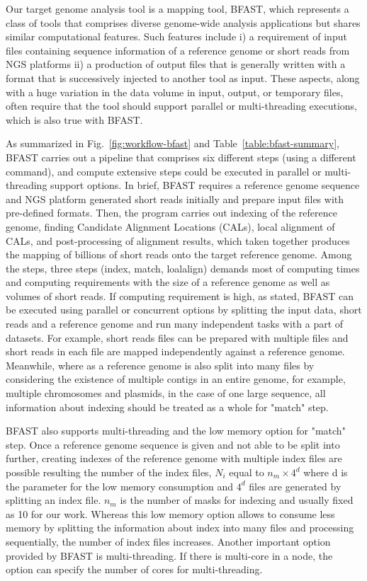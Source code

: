 \documentclass{acm_proc_article-sp}
\begin{document}
Our target genome analysis tool is a mapping tool, BFAST\cite{bfast2009,bfast2009b}, which represents a class of tools that comprises diverse genome-wide analysis applications but shares similar computational features.  Such features include i) a requirement of input files containing sequence information of a reference genome or short reads from NGS platforms ii) a production of output files that is generally written with a format that is successively injected to another tool as input.  These aspects, along with a huge variation in the data volume in input, output, or temporary files, often require that the tool should support parallel or multi-threading executions, which is also true with BFAST\cite{bfast2009}.

As summarized in Fig.~\ref{fig:workflow-bfast} and Table~\ref{table:bfast-summary}, BFAST carries out a pipeline that comprises six different steps (using a different command), and compute extensive steps could be executed in parallel or multi-threading support options.  In brief, BFAST requires a reference genome sequence and NGS platform generated short reads initially and prepare input files with pre-defined formats.  Then, the program carries out indexing of the reference genome, finding Candidate Alignment Locations (CALs), local alignment of CALs, and post-processing of alignment results, which taken together produces the mapping of billions of short reads onto the target reference genome.  Among the steps, three steps (index, match, loalalign) demands most of computing times and computing requirements with the size of a reference genome as well as volumes of short reads.  If computing requirement is high, as stated, BFAST can be executed using parallel or concurrent options by splitting the input data, short reads and a reference genome and run many independent tasks with a part of datasets.  For example, short reads files can be prepared with multiple files and short reads in each file are mapped independently against a reference genome.  Meanwhile, where as a reference genome is also split into many files by considering the existence of multiple contigs in an entire genome, for example, multiple chromosomes and plasmids, in the case of one large sequence, all information about indexing should be treated as a whole for "match" step. 

BFAST also supports multi-threading and the low memory option for "match" step. Once a reference genome sequence is given and not able to be split into further, creating indexes of the reference genome with multiple index files are possible resulting the number of the index files, $N_i$ equal to $n_m \times 4^d$ where d is the parameter for the low memory consumption and $4^d$ files are generated by splitting an index file.  $n_m$ is the number of masks for indexing and usually fixed as 10 for our work.  Whereas this low memory option allows to consume less memory by splitting the information about index into many files and processing sequentially, the number of index files increases.  Another important option provided by BFAST is multi-threading.  If there is multi-core in a node, the option can specify the number of cores for multi-threading.    
\end{document}

